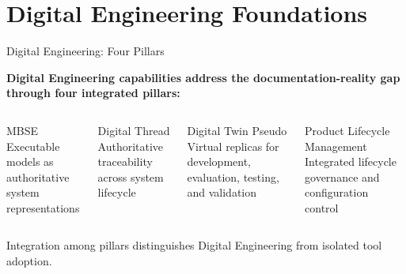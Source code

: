 \documentclass{beamer}
\begin{document}
\section{Digital Engineering Foundations}
\begin{frame}[allowframebreaks]{Digital Engineering: Four Pillars}
  \begin{center}
    \textbf{Digital Engineering capabilities address the documentation-reality gap through four integrated pillars:}
  \end{center}

  \vspace{0.3cm}
  \begin{columns}
    \begin{block}{MBSE}
      Executable models as authoritative system representations
    \end{block}
    \begin{block}{Digital Thread}
      Authoritative traceability across system lifecycle
    \end{block}

    \begin{block}{Digital Twin}
      Pseudo Virtual replicas for development, evaluation, testing, and validation
    \end{block}
    \begin{block}{Product Lifecycle Management}
      Integrated lifecycle governance and configuration control
    \end{block}
  \end{columns}

  \vspace{0.3cm}
  \begin{center}
    \small{Integration among pillars distinguishes Digital Engineering from isolated tool adoption.}
  \end{center}
\end{frame}

\end{document}
